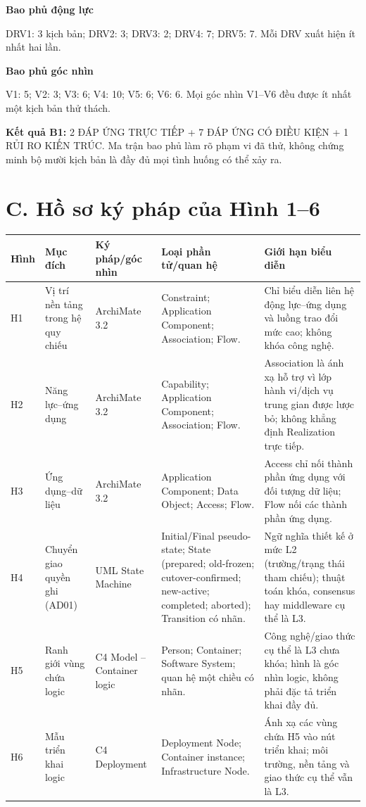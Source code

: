 \documentclass[10pt]{article}
\newcommand{\smallhead}[1]{\textbf{#1}}
\begin{document}
\vspace{7pt}
\begin{minipage}[t]{0.47\textwidth}
\textbf{Bao phủ động lực}\par
DRV1: 3 kịch bản; DRV2: 3; DRV3: 2; DRV4: 7; DRV5: 7. Mỗi DRV xuất hiện ít nhất hai lần.
\end{minipage}\hfill
\begin{minipage}[t]{0.49\textwidth}
\textbf{Bao phủ góc nhìn}\par
V1: 5; V2: 3; V3: 6; V4: 10; V5: 6; V6: 6. Mọi góc nhìn V1--V6 đều được ít nhất một kịch bản thử thách.
\end{minipage}

\vspace{7pt}
\textbf{Kết quả B1:} 2 ĐÁP ỨNG TRỰC TIẾP + 7 ĐÁP ỨNG CÓ ĐIỀU KIỆN + 1 RỦI RO KIẾN TRÚC. Ma trận bao phủ làm rõ phạm vi đã thử, không chứng minh bộ mười kịch bản là đầy đủ mọi tình huống có thể xảy ra.
\newpage

\section*{C. Hồ sơ ký pháp của Hình 1--6}
\begin{tabularx}{\textwidth}{@{}p{1.0cm}p{3.2cm}p{3.1cm}p{6.0cm}Y@{}}
\toprule
\smallhead{Hình} & \smallhead{Mục đích} & \smallhead{Ký pháp/góc nhìn} & \smallhead{Loại phần tử/quan hệ} & \smallhead{Giới hạn biểu diễn} \\
\midrule
H1 & Vị trí nền tảng trong hệ quy chiếu & ArchiMate 3.2 & Constraint; Application Component; Association; Flow. & Chỉ biểu diễn liên hệ động lực--ứng dụng và luồng trao đổi mức cao; không khóa công nghệ. \\
H2 & Năng lực--ứng dụng & ArchiMate 3.2 & Capability; Application Component; Association; Flow. & Association là ánh xạ hỗ trợ vì lớp hành vi/dịch vụ trung gian được lược bỏ; không khẳng định Realization trực tiếp. \\
H3 & Ứng dụng--dữ liệu & ArchiMate 3.2 & Application Component; Data Object; Access; Flow. & Access chỉ nối thành phần ứng dụng với đối tượng dữ liệu; Flow nối các thành phần ứng dụng. \\
H4 & Chuyển giao quyền ghi (AD01) & UML State Machine & Initial/Final pseudo-state; State (prepared; old-frozen; cutover-confirmed; new-active; completed; aborted); Transition có nhãn. & Ngữ nghĩa thiết kế ở mức L2 (trường/trạng thái tham chiếu); thuật toán khóa, consensus hay middleware cụ thể là L3. \\
H5 & Ranh giới vùng chứa logic & C4 Model -- Container logic & Person; Container; Software System; quan hệ một chiều có nhãn. & Công nghệ/giao thức cụ thể là L3 chưa khóa; hình là góc nhìn logic, không phải đặc tả triển khai đầy đủ. \\
H6 & Mẫu triển khai logic & C4 Deployment & Deployment Node; Container instance; Infrastructure Node. & Ánh xạ các vùng chứa H5 vào nút triển khai; môi trường, nền tảng và giao thức cụ thể vẫn là L3. \\
\bottomrule
\end{tabularx}
\end{document}
